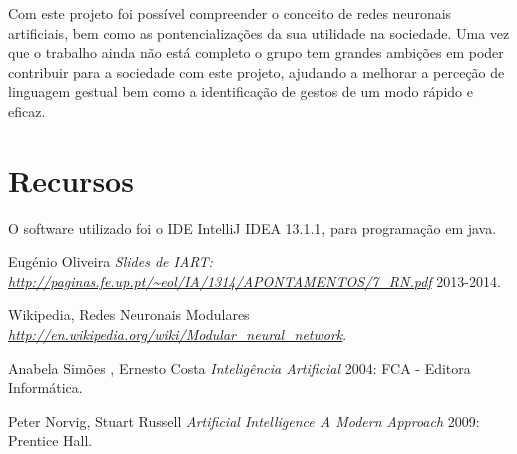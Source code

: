 \documentclass[10pt,a4paper]{article}
\begin{document}
Com este projeto foi possível compreender o conceito de redes neuronais artificiais, bem como as pontencializações da sua utilidade na sociedade. Uma vez que o trabalho ainda não está completo o grupo tem grandes ambições em poder contribuir para a sociedade com este projeto, ajudando a melhorar a perceção de linguagem gestual bem como a identificação de gestos de um modo rápido e eficaz.

\section{Recursos}

O software utilizado foi o IDE IntelliJ IDEA 13.1.1, para programação em java.


 \begin{thebibliography}{1}

   Eugénio Oliveira {\em Slides de IART: {\url{http://paginas.fe.up.pt/~eol/IA/1314/APONTAMENTOS/7_RN.pdf}}}  2013-2014.
  
   Wikipedia, Redes Neuronais Modulares {\em\url{http://en.wikipedia.org/wiki/Modular_neural_network}}.

   Anabela Simões , Ernesto Costa {\em Inteligência Artificial} 2004: FCA - Editora Informática.
  
   Peter Norvig, Stuart Russell {\em Artificial Intelligence A Modern Approach } 2009: Prentice Hall.
  \end{thebibliography}
  \printindex
\end{document}
